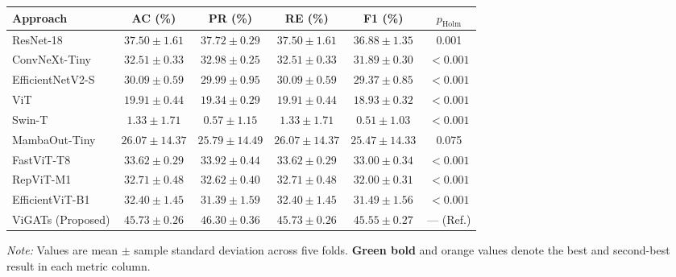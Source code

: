 \documentclass[]{interact}
\theoremstyle{plain}
\theoremstyle{definition}
\theoremstyle{remark}
\newcommand{\bestresult}[1]{\textcolor{bestgreen}{\textbf{#1}}}
\newcommand{\secondresult}[1]{\textcolor{secondorange}{#1}}
\begin{document}
\begin{table}[H]
\footnotesize
\setlength{\tabcolsep}{3.0pt}
{\begin{tabular}{lccccc} \toprule
\textbf{Approach} & \textbf{AC (\%)} & \textbf{PR (\%)} & \textbf{RE (\%)} & \textbf{F1 (\%)} & \textbf{$p_{\mathrm{Holm}}$} \\ \midrule
ResNet-18 \citep{he2016deep} & \secondresult{$37.50 \pm 1.61$} & \secondresult{$37.72 \pm 0.29$} & \secondresult{$37.50 \pm 1.61$} & \secondresult{$36.88 \pm 1.35$} & 0.001 \\
ConvNeXt-Tiny \citep{liu2022convnext} & $32.51 \pm 0.33$ & $32.98 \pm 0.25$ & $32.51 \pm 0.33$ & $31.89 \pm 0.30$ & $< 0.001$ \\
EfficientNetV2-S \citep{tan2021efficientnetv2} & $30.09 \pm 0.59$ & $29.99 \pm 0.95$ & $30.09 \pm 0.59$ & $29.37 \pm 0.85$ & $< 0.001$ \\
ViT \citep{dosovitskiy2020image} & $19.91 \pm 0.44$ & $19.34 \pm 0.29$ & $19.91 \pm 0.44$ & $18.93 \pm 0.32$ & $< 0.001$ \\
Swin-T \citep{liu2021swin} & $1.33 \pm 1.71$ & $0.57 \pm 1.15$ & $1.33 \pm 1.71$ & $0.51 \pm 1.03$ & $< 0.001$ \\
MambaOut-Tiny \citep{yu2024mambaout} & $26.07 \pm 14.37$ & $25.79 \pm 14.49$ & $26.07 \pm 14.37$ & $25.47 \pm 14.33$ & 0.075 \\
FastViT-T8 \citep{vasu2023fastvit} & $33.62 \pm 0.29$ & $33.92 \pm 0.44$ & $33.62 \pm 0.29$ & $33.00 \pm 0.34$ & $< 0.001$ \\
RepViT-M1 \citep{wang2024repvit} & $32.71 \pm 0.48$ & $32.62 \pm 0.40$ & $32.71 \pm 0.48$ & $32.00 \pm 0.31$ & $< 0.001$ \\
EfficientViT-B1 \citep{cai2023efficientvit} & $32.40 \pm 1.45$ & $31.39 \pm 1.59$ & $32.40 \pm 1.45$ & $31.49 \pm 1.56$ & $< 0.001$ \\
ViGATs (Proposed) & \bestresult{$45.73 \pm 0.26$} & \bestresult{$46.30 \pm 0.36$} & \bestresult{$45.73 \pm 0.26$} & \bestresult{$45.55 \pm 0.27$} & --- (Ref.) \\
\bottomrule
\end{tabular}}
\label{tab:tiny_imagenet}
\parbox{\textwidth}{\vspace{2pt}\footnotesize\textit{Note:} Values are mean $\pm$ sample standard deviation across five folds. \bestresult{Green bold} and \secondresult{orange} values denote the best and second-best result in each metric column.}
\end{table}
\end{document}
